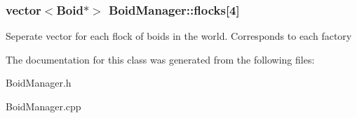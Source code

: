 \subsubsection[{\texorpdfstring{flocks}{flocks}}]{\setlength{\rightskip}{0pt plus 5cm}vector$<${\bf Boid}$\ast$$>$ Boid\+Manager\+::flocks\mbox{[}4\mbox{]}}\hypertarget{class_boid_manager_aa4c01eee1d357cb75db650bb1c63bf60}{}\label{class_boid_manager_aa4c01eee1d357cb75db650bb1c63bf60}
Seperate vector for each flock of boids in the world. Corresponds to each factory 

The documentation for this class was generated from the following files\+:\begin{DoxyCompactItemize}
\item 
Boid\+Manager.\+h\item 
Boid\+Manager.\+cpp\end{DoxyCompactItemize}

